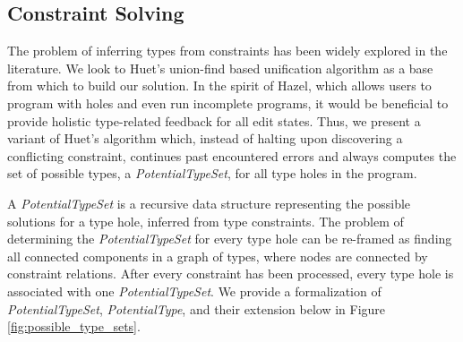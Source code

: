 
\usetikzlibrary{positioning,calc}

\subsection{Constraint Solving}
\label{sec:infalg}
The problem of inferring types from constraints has been widely explored in the literature. We look to Huet's union-find based unification algorithm \cite{G. Huet} as a base from which to build our solution. In the spirit of Hazel, which allows users to program with holes and even run incomplete programs, it would be beneficial to provide holistic type-related feedback for all edit states. Thus, we present a variant of Huet's algorithm which, instead of halting upon discovering a conflicting constraint, continues past encountered errors and always computes the set of possible types, a \textit{PotentialTypeSet}, for all type holes in the program.

A \textit{PotentialTypeSet} is a recursive data structure representing the possible solutions for a type hole, inferred from type constraints. The problem of determining the \textit{PotentialTypeSet} for every type hole can be re-framed as finding all connected components in a graph of types, where nodes are connected by constraint relations. After every constraint has been processed, every type hole is associated with one \textit{PotentialTypeSet}. We provide a formalization of \textit{PotentialTypeSet}, \textit{PotentialType}, and their extension below in Figure \ref{fig:possible_type_sets}.

